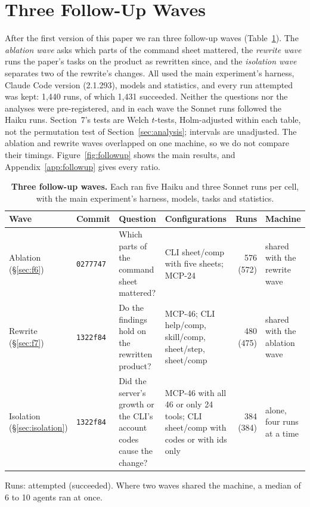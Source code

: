 \documentclass[sigconf,nonacm]{acmart}
\newcommand{\cfg}[1]{\textsf{#1}}
\begin{document}
\section{Three Follow-Up Waves}
\label{sec:followup}

After the first version of this paper we ran three follow-up waves (Table~\ref{tab:waves3}). The \emph{ablation wave} asks which parts of the command sheet mattered, the \emph{rewrite wave} runs the paper's tasks on the product as rewritten since, and the \emph{isolation wave} separates two of the rewrite's changes. All used the main experiment's harness, Claude Code version (2.1.293), models and statistics, and every run attempted was kept: 1{,}440 runs, of which 1{,}431 succeeded. Neither the questions nor the analyses were pre-registered, and in each wave the Sonnet runs followed the Haiku runs. Section~7's tests are Welch $t$-tests, Holm-adjusted within each table, not the permutation test of Section~\ref{sec:analysis}; intervals are unadjusted. The ablation and rewrite waves overlapped on one machine, so we do not compare their timings. Figure~\ref{fig:followup} shows the main results, and Appendix~\ref{app:followup} gives every ratio.

\begin{table}[t]
\caption{\textbf{Three follow-up waves.} Each ran five Haiku and three Sonnet runs per cell, with the main experiment's harness, models, tasks and statistics.}
\label{tab:waves3}
\small
\begin{tabularx}{\textwidth}{@{}l l >{\raggedright\arraybackslash}X >{\raggedright\arraybackslash}X r >{\raggedright\arraybackslash}p{2.3cm}@{}}
\toprule
\textbf{Wave} & \textbf{Commit} & \textbf{Question} & \textbf{Configurations} & \textbf{Runs} & \textbf{Machine} \\
\midrule
Ablation (\S\ref{sec:f6}) & \texttt{0277747} & Which parts of the command sheet mattered? & \cfg{CLI sheet/comp} with five sheets; \cfg{MCP-24} & 576 (572) & shared with the rewrite wave \\
Rewrite (\S\ref{sec:f7}) & \texttt{1322f84} & Do the findings hold on the rewritten product? & \cfg{MCP-46}; \cfg{CLI help/comp}, \cfg{skill/comp}, \cfg{sheet/step}, \cfg{sheet/comp} & 480 (475) & shared with the ablation wave \\
Isolation (\S\ref{sec:isolation}) & \texttt{1322f84} & Did the server's growth or the CLI's account codes cause the change? & \cfg{MCP-46} with all 46 or only 24 tools; \cfg{CLI sheet/comp} with codes or with ids only & 384 (384) & alone, four runs at a time \\
\bottomrule
\end{tabularx}

\smallskip\footnotesize Runs: attempted (succeeded). Where two waves shared the machine, a median of 6 to 10 agents ran at once.
\end{table}
\end{document}
